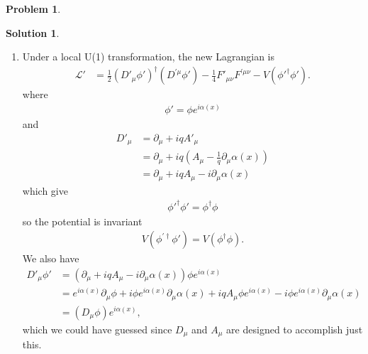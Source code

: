 \documentclass[a4paper,11pt]{article}
\numberwithin{equation}{section}
\theoremstyle{definition}
\newtheorem{prob}{Problem}[section]
\newtheorem{sln}{Solution}[section]
\newcommand{\p}{\partial}
\newcommand{\lag}{\mathcal{L}}
\begin{document}
\begin{prob}
	
		\begin{sln}
			$\,$
			\begin{enumerate}
				\item Under a local U(1) transformation, the new Lagrangian is
				\begin{align}
				\lag' 
				&= \frac{1}{2}(D'_\mu\phi')^\dagger(D^{'\mu}\phi') - \frac{1}{4}F'_{\mu\nu}F^{'\mu\nu} - V(\phi'^\dagger\phi').
				\end{align}
				where
				\begin{align}
				\phi' = \phi e^{i\alpha(x)}
				\end{align}
				and
				\begin{align}
				D'_\mu &= \p_\mu + iqA'_\mu\nonumber\\ 
				&= \p_\mu + iq\left(A_\mu - \frac{1}{q}\p_\mu\alpha(x)\right)\nonumber\\
				&= \p_\mu + iqA_\mu -i \p_\mu\alpha(x)
				\end{align}
				which give
				\begin{align}
				\phi'^\dagger\phi' = \phi^\dagger\phi
				\end{align}
				so the potential is invariant
				\begin{align}
				V(\phi^{'\dagger}\phi') = V(\phi^\dagger\phi).
				\end{align}
				We also have
				\begin{align}
				D'_\mu\phi' &= (\p_\mu + iqA_\mu -i \p_\mu\alpha(x))\phi e^{i\alpha(x)}\nonumber\\
				&= e^{i\alpha(x)}\p_\mu \phi + i\phi e^{i\alpha(x)} \p_\mu\alpha(x) + iqA_\mu \phi e^{i\alpha(x)} - i \phi e^{i\alpha(x)} \p_\mu\alpha(x) \nonumber\\
				&= (D_\mu \phi)e^{i\alpha(x)},
				\end{align}
				which we could have guessed since $D_\mu$ and $A_\mu$ are designed to accomplish just this.\\
				

\end{enumerate}
\end{sln}
\end{prob}
\end{document}
